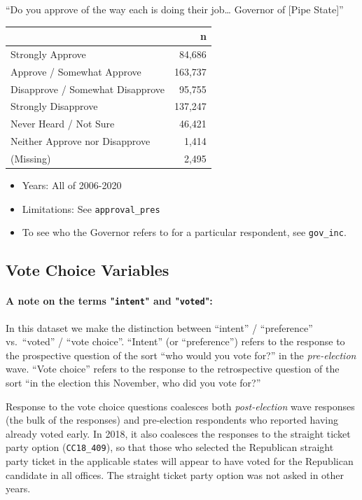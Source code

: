 \documentclass[10pt,article,oneside]{memoir}
\theoremstyle{definition}
\begin{document}
``Do you approve of the way each is doing their job\ldots{} Governor of
{[}Pipe State{]}''

\begin{table}[H]
\centering
\begin{tabular}[t]{lr}
\toprule
 & n\\
\midrule
Strongly Approve & 84,686\\
Approve / Somewhat Approve & 163,737\\
Disapprove / Somewhat Disapprove & 95,755\\
Strongly Disapprove & 137,247\\
Never Heard / Not Sure & 46,421\\
Neither Approve nor Disapprove & 1,414\\
(Missing) & 2,495\\
\bottomrule
\end{tabular}
\end{table}

\begin{itemize}
\tightlist
\item
  Years: All of 2006-2020
\item
  Limitations: See \texttt{approval\_pres}
\item
  To see who the Governor refers to for a particular respondent, see
  \texttt{gov\_inc}.
\end{itemize}

\newpage

\hypertarget{vote-choice-variables}{%
\subsection{Vote Choice Variables}\label{vote-choice-variables}}

\paragraph{A note on the terms "\texttt{intent}" and "\texttt{voted}":}

In this dataset we make the distinction between ``intent'' /
``preference'' vs.~``voted'' / ``vote choice''. ``Intent'' (or
``preference'') refers to the response to the prospective question of
the sort ``who would you vote for?'' in the \emph{pre-election} wave.
``Vote choice'' refers to the response to the retrospective question of
the sort ``in the election this November, who did you vote for?''

Response to the vote choice questions coalesces both
\emph{post-election} wave responses (the bulk of the responses) and
pre-election respondents who reported having already voted early. In
2018, it also coalesces the responses to the straight ticket party
option (\texttt{CC18\_409}), so that those who selected the Republican
straight party ticket in the applicable states will appear to have voted
for the Republican candidate in all offices. The straight ticket party
option was not asked in other years.
\end{document}
